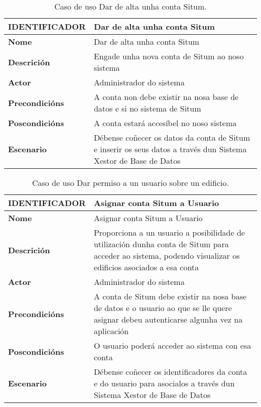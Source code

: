\begin{table}[tbh]
	\footnotesize
	\centering
	\begin{tabular}{|l|p{10cm}|}
		\hline 
		\textbf{IDENTIFICADOR}	& \textbf{Dar de alta unha conta Situm} \\ 
		\hline 
		\textbf{Nome} & Dar de alta unha conta Situm \\ 
		\hline 
		\textbf{Descrición} & Engade unha nova conta de Situm ao noso sistema \\ 
		\hline 
		\textbf{Actor} & Administrador do sistema \\ 
		\hline 
		\textbf{Precondicións} & A conta non debe existir na nosa base de datos e si no sistema de Situm \\ 
		\hline 
		\textbf{Poscondicións} & A conta estará accesíbel no noso sistema \\ 
		\hline 
		\textbf{Escenario} & Débense coñecer os datos da conta de Situm e inserir os seus datos a través dun Sistema Xestor de Base de Datos \\ 
		\hline 
	\end{tabular}
	\caption{Caso de uso Dar de alta unha conta Situm.}
	\label{tab:cuDarAltaContaSitum}
\end{table}

\begin{table}[tbh]
	\footnotesize
	\centering
	\begin{tabular}{|l|p{10cm}|}
		\hline 
		\textbf{IDENTIFICADOR}	& \textbf{Asignar conta Situm a Usuario} \\ 
		\hline 
		\textbf{Nome} & Asignar conta Situm a Usuario \\ 
		\hline 
		\textbf{Descrición} & Proporciona a un usuario a posibilidade de utilización dunha conta de Situm para acceder ao sistema, podendo visualizar os edificios asociados a esa conta \\ 
		\hline 
		\textbf{Actor} & Administrador do sistema \\ 
		\hline 
		\textbf{Precondicións} & A conta de Situm debe existir na nosa base de datos e o usuario ao que se lle quere asignar debeu autenticarse algunha vez na aplicación \\ 
		\hline 
		\textbf{Poscondicións} & O usuario poderá acceder ao sistema con esa conta \\ 
		\hline 
		\textbf{Escenario} & Débense coñecer os identificadores da conta e do usuario para asocialos a través dun Sistema Xestor de Base de Datos \\ 
		\hline 
	\end{tabular}
	\caption{Caso de uso Dar permiso a un usuario sobre un edificio.}
	\label{tab:cuAsignarContaSitumUsuario}
\end{table}